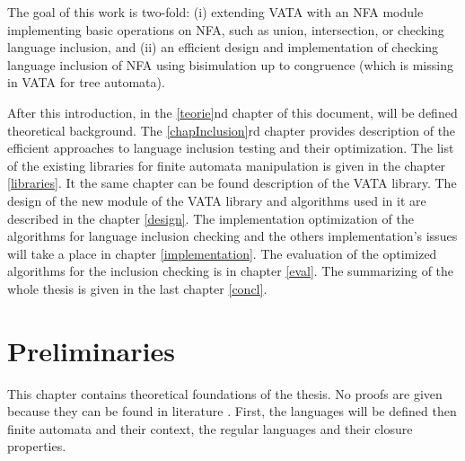 The goal of this work is two-fold: (i) extending VATA with an NFA module implementing basic operations on NFA, such as union, intersection, or 
checking language inclusion, and (ii) an efficient design and implementation of checking language inclusion of NFA using 
bisimulation up to congruence (which is missing in VATA for tree automata).

After this introduction, in the \ref{teorie}nd chapter of this document, 
will be defined theoretical background. The \ref{chapInclusion}rd chapter provides description of the 
efficient approaches to language inclusion testing and their optimization.
The list of the existing libraries for finite automata manipulation is given in the chapter \ref{libraries}. It the same chapter
can be found description of the VATA library. 
The design of the new module of the VATA library and algorithms used in it are described in the chapter \ref{design}. 
The implementation optimization of the algorithms for language inclusion checking and the others implementation's issues will take a place
in chapter \ref{implementation}. The evaluation of the optimized algorithms for the inclusion checking is in chapter \ref{eval}. The summarizing of the whole
thesis is given in the last chapter \ref{concl}.


\chapter{Preliminaries}
This chapter contains theoretical foundations of the thesis. No proofs are given because they can be found in literature \cite{kozen,ullman}. 
First, the languages will be defined then finite automata and their context, the regular languages and their closure properties. 
\label{teorie}

